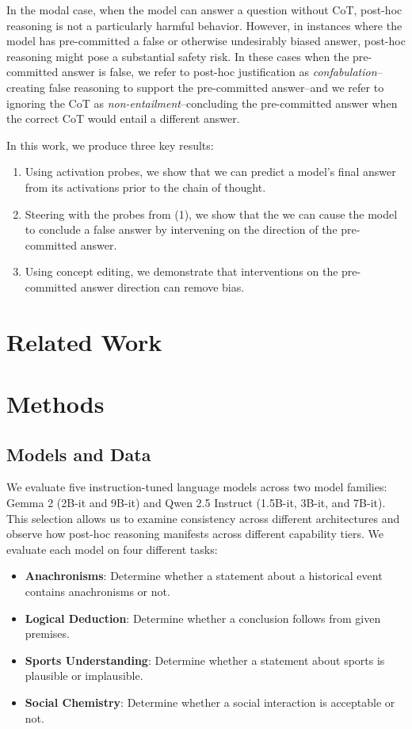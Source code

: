 \documentclass{article}
\begin{document}
In the modal case, when the model can answer a question without CoT, post-hoc reasoning is not a particularly harmful behavior. 
However, in instances where the model has pre-committed a false or otherwise undesirably biased answer, post-hoc reasoning might pose a substantial safety risk. 
In these cases when the pre-committed answer is false, we refer to post-hoc justification as \textit{confabulation}--creating false reasoning to support the pre-committed answer--and we refer to ignoring the CoT as \textit{non-entailment}--concluding the pre-committed answer when the correct CoT would entail a different answer.

In this work, we produce three key results:
\begin{enumerate}
    \item Using activation probes, we show that we can predict a model's final answer from its activations prior to the chain of thought.
    \item Steering with the probes from (1), we show that the we can cause the model to conclude a false answer by intervening on the direction of the pre-committed answer.
    \item Using concept editing, we demonstrate that interventions on the pre-committed answer direction can remove bias.
\end{enumerate}


\section{Related Work}

\section{Methods}

\subsection{Models and Data}

We evaluate five instruction-tuned language models across two model families: Gemma 2 (2B-it and 9B-it) and Qwen 2.5 Instruct (1.5B-it, 3B-it, and 7B-it). This selection allows us to examine consistency across different architectures and observe how post-hoc reasoning manifests across different capability tiers. We evaluate each model on four different tasks:
\begin{itemize}
    \item \textbf{Anachronisms}: Determine whether a statement about a historical event contains anachronisms or not.
    \item \textbf{Logical Deduction}: Determine whether a conclusion follows from given premises.
    \item \textbf{Sports Understanding}: Determine whether a statement about sports is plausible or implausible.
    \item \textbf{Social Chemistry}: Determine whether a social interaction is acceptable or not.
\end{itemize}
\end{document}
